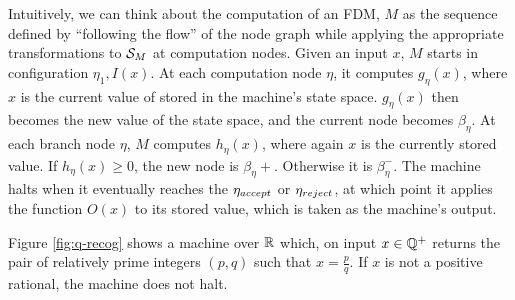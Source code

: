 
\vspace{\baselineskip}

Intuitively, we can think about the computation of an FDM, $M$ as the
sequence defined by ``following the flow'' of the node graph while
applying the appropriate transformations to $\mathcal{S}_M$ at
computation nodes. Given an input $x$, $M$ starts in configuration
$\eta_1, I(x)$. At each computation node $\eta$, it computes
$g_\eta(x)$, where $x$ is the current value of stored in the machine's
state space.  $g_\eta(x)$ then becomes the new value of the state
space, and the current node becomes $\beta_{\eta}$.  At each branch
node $\eta$, $M$ computes $h_\eta(x)$, where again $x$ is the
currently stored value.  If $h_\eta(x) \geq 0$, the new node is
$\beta_\eta+$.  Otherwise it is $\beta_\eta^-$.  The machine halts
when it eventually reaches the $\eta_{accept}$ or $\eta_{reject}$, at which point
it applies the function $O(x)$ to its stored value, which is
taken as the machine's output.\\

\begin{example}
  Figure \ref{fig:q-recog} shows a machine over $\mathbb{R}$ which, on
  input $x \in \mathbb{Q}^+ $ returns the pair of relatively prime
  integers $(p,q)$ such that $x = \frac{p}{q}$.  If $x$ is not a
  positive rational, the machine does not halt.
\end{example}

